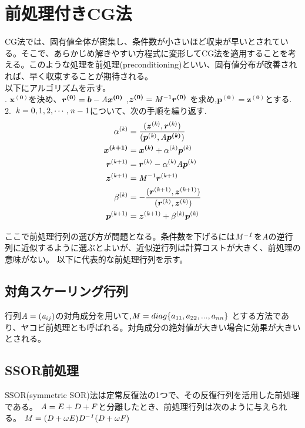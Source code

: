 ﻿\documentclass[12pt, a4paper]{jsarticle}
\begin{document}
\section{前処理付きCG法}
CG法では、固有値全体が密集し、条件数が小さいほど収束が早いとされている。そこで、あらかじめ解きやすい方程式に変形してCG法を適用することを考える。このような処理を前処理(preconditioning)といい、固有値分布が改善されれば、早く収束することが期待される。\\

以下にアルゴリズムを示す。\\

.  $\bm{x^{(0)}} $を決め、$\bm{r^{(0)}}=\bm{b}-{\it A}\bm{x^{(0)}}$ ,$\bm{z^{(0)}}= {\it M}^{-1} \bm{r^{(0)}}$ を求め,$\bm{p^{(0)}}=\bm{z^{(0)}}$とする. \\
2.\ $ {\it k}=0,1,2,\cdots ,{\it n}-1$について、次の手順を繰り返す. 
\begin{align*}
\alpha ^{({\it k})} &= \frac{(\bm{z}^{({\it k})},\bm{r}^{({\it k})})}{(\bm{p}^{({\it k})},{\it A}\bm{p^{({\it k})}})} \\
\bm{x^{({\it k}+1)}}&= \bm{x^{({\it k})}}+\alpha ^{({\it k})}\bm{p}^{({\it k})}\\
\bm{r}^{({\it k}+1)}&=\bm{r}^{({\it k})}-\alpha ^{({\it k})}{\it A} \bm{p}^{({\it k})}\\
\bm{z}^{({\it k}+1)} &= {\it M}^{-1}\bm{r}^{({\it k}+1)}\\
\beta ^{({\it k})} &= -\frac{(\bm{r}^{({\it k}+1)},\bm{z}^{({\it k}+1)})}{(\bm{r}^{({\it k})},\bm{z}^{({\it k})})}\\
\bm{p}^{({\it k}+1)} &= \bm{z}^{({\it k}+1)}+\beta ^{({\it k})}\bm{p}^{({\it k})}
\end{align*}


ここで前処理行列の選び方が問題となる。条件数を下げるには${\it M^{-1}}$を{\it A}の逆行列に近似するように選ぶとよいが、近似逆行列は計算コストが大きく、前処理の意味がない。
以下に代表的な前処理行列を示す。

\subsection{対角スケーリング行列}%
行列${\it A} =({\it a}_{ij})$の対角成分を用いて,${\it M}=diag \{ a_{11} ,a_{22},...,a_{nn}\}$ とする方法であり、ヤコビ前処理とも呼ばれる。対角成分の絶対値が大きい場合に効果が大きいとされる。


\subsection{SSOR前処理}%
SSOR(symmetric SOR)法は定常反復法の1つで、その反復行列を活用した前処理である。
${\it A} =E + D+F$と分離したとき、前処理行列は次のように与えられる。
${\it M}=({\it D}+\omega{\it E}){\it D^{-1}}({\it D}+\omega{\it F})$
\end{document}
